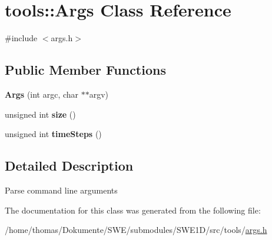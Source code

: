\hypertarget{classtools_1_1Args}{\section{tools\-:\-:Args Class Reference}
\label{classtools_1_1Args}
}


{\ttfamily \#include $<$args.\-h$>$}

\subsection*{Public Member Functions}
\begin{DoxyCompactItemize}
\item 
\hypertarget{classtools_1_1Args_ae76fc7da42f02c3803c704945e09889a}{{\bfseries Args} (int argc, char $\ast$$\ast$argv)}\label{classtools_1_1Args_ae76fc7da42f02c3803c704945e09889a}

\item 
\hypertarget{classtools_1_1Args_a797dee3c2572f4970633923efe02a952}{unsigned int {\bfseries size} ()}\label{classtools_1_1Args_a797dee3c2572f4970633923efe02a952}

\item 
\hypertarget{classtools_1_1Args_a80525b2b8c459ed083973934092078b2}{unsigned int {\bfseries time\-Steps} ()}\label{classtools_1_1Args_a80525b2b8c459ed083973934092078b2}

\end{DoxyCompactItemize}


\subsection{Detailed Description}
Parse command line arguments 

The documentation for this class was generated from the following file\-:\begin{DoxyCompactItemize}
\item 
/home/thomas/\-Dokumente/\-S\-W\-E/submodules/\-S\-W\-E1\-D/src/tools/\hyperlink{args_8h}{args.\-h}\end{DoxyCompactItemize}
